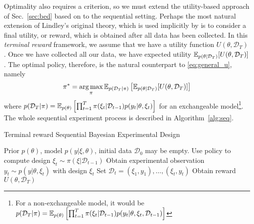 \documentclass[a4paper, 10pt]{report}
\theoremstyle{plain}
\begin{document}
	Optimality also requires a criterion, so we must extend the utility-based approach of Sec.~\ref{sec:bed} based on \citet{lindley1972} to the sequential setting.
	Perhaps the most natural extension of Lindley's original theory, which is used implicitly by \citet{huan2016sequential,foster2021dad} is to consider a final utility, or reward, which is obtained after all data has been collected. In this \emph{terminal reward} framework, we assume that we have a utility function $U(\theta,\mathcal{D}_T)$. Once we have collected all our data, we have expected utility $\mathbb{E}_{p(\theta|\mathcal{D}_T)}[U(\theta,\mathcal{D}_T)]$.
	The optimal policy, therefore, is the natural counterpart to \eqref{eq:general_u}, namely
	\begin{equation}
	\label{eq:policy_general_u}
	\pi^* = \operatorname*{arg\,max}_\pi \mathbb{E}_{p(\mathcal{D}_T|\pi)}\left[ \mathbb{E}_{p(\theta|\mathcal{D}_T)}[U(\theta,\mathcal{D}_T)] \right]
	\end{equation}
	where $p(\mathcal{D}_T|\pi) = \mathbb{E}_{p(\theta)}\left[\prod_{t=1}^T \pi(\xi_t|\mathcal{D}_{t-1})p(y_t|\theta,\xi_t)  \right]$ for an exchangeable model\footnote{For a non-exchangeable model, it would be $p(\mathcal{D}_T|\pi) = \mathbb{E}_{p(\theta)}\left[\prod_{t=1}^T \pi(\xi_t|\mathcal{D}_{t-1})p(y_t|\theta,\xi_t,\mathcal{D}_{t-1})  \right]$}.
	The whole sequential experiment process is described in Algorithm~\ref{alg:seq}.
	
	\begin{algorithm}[t]
		\caption{Terminal reward Sequential Bayesian Experimental Design}\label{alg:seq}
		\begin{algorithmic}
			\Require Prior $p(\theta)$, model $p(y|\xi,\theta)$, initial data $\mathcal{D}_0$ may be empty.
			\State Use policy to compute design $\xi_t \sim \pi(\xi|\mathcal{D}_{t-1})$
			\State Obtain experimental observation $y_t \sim p(y|\theta,\xi_t)$ with design $\xi_t$
			\State Set $\mathcal{D}_{t} = (\xi_1,y_1),\dots,(\xi_t,y_t)$
			\EndFor
			\State Obtain reward $U(\theta,\mathcal{D}_T)$
		\end{algorithmic}
	\end{algorithm}
	
\end{document}
